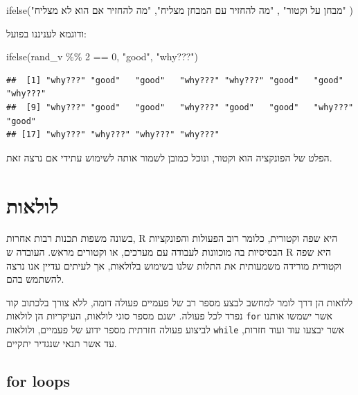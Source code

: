 \documentclass[
]{book}
\newenvironment{Shaded}{\begin{snugshade}}{\end{snugshade}}
\newcommand{\DecValTok}[1]{\textcolor[rgb]{0.00,0.00,0.81}{#1}}
\newcommand{\FunctionTok}[1]{\textcolor[rgb]{0.00,0.00,0.00}{#1}}
\newcommand{\NormalTok}[1]{#1}
\newcommand{\SpecialCharTok}[1]{\textcolor[rgb]{0.00,0.00,0.00}{#1}}
\newcommand{\StringTok}[1]{\textcolor[rgb]{0.31,0.60,0.02}{#1}}
\begin{document}
\begin{Shaded}
\begin{Highlighting}[]
\FunctionTok{ifelse}\NormalTok{(}\StringTok{"מבחן על וקטור"}\NormalTok{ ,}
       \StringTok{"מה להחזיר עם המבחן מצליח"}\NormalTok{,}
       \StringTok{"מה להחזיר אם הוא לא מצליח"}
\NormalTok{       )}
\end{Highlighting}
\end{Shaded}

ודוגמא לעניננו בפועל:

\begin{Shaded}
\begin{Highlighting}[]
\FunctionTok{ifelse}\NormalTok{(rand\_v }\SpecialCharTok{\%\%} \DecValTok{2} \SpecialCharTok{==} \DecValTok{0}\NormalTok{,}
       \StringTok{"good"}\NormalTok{,}
       \StringTok{"why???"}\NormalTok{)}
\end{Highlighting}
\end{Shaded}

\begin{verbatim}
##  [1] "why???" "good"   "good"   "why???" "why???" "good"   "good"   "why???"
##  [9] "why???" "good"   "good"   "why???" "good"   "good"   "why???" "good"  
## [17] "why???" "why???" "why???" "why???"
\end{verbatim}

הפלט של הפונקציה הוא וקטור, ונוכל כמובן לשמור אותה לשימוש עתידי אם נרצה זאת.

\hypertarget{ux5dcux5d5ux5dcux5d0ux5d5ux5ea}{%
\chapter{לולאות}\label{ux5dcux5d5ux5dcux5d0ux5d5ux5ea}}

בשונה משפות תכנות רבות אחרות,
R
היא שפה וקטורית,
כלומר רוב הפעולות והפונקציות הבסיסיות בה מוכוונות לעבודה עם מערכים, או וקטורים מראש. העובדה ש
R
היא שפה וקטורית מורידה משמעותית את התלות שלנו בשימוש בלולאות, אך לעיתים עדיין אנו נרצה להשתמש בהם.

ללואות הן דרך לומר למחשב לבצע מספר רב של פעמיים פעולה דומה, ללא צורך בלכתוב קוד נפרד לכל פעולה. ישנם מספר סוגי לולאות, העיקריות הן לולאות
\texttt{for}
אשר ישמשו אותנו לביצוע פעולה חזרתית מספר ידוע של פעמיים,
ולולאות
\texttt{while}
אשר יבצעו עוד ועוד חזרות, עד אשר תנאי שנגדיר יתקיים.

\hypertarget{for-loops}{%
\section{for loops}\label{for-loops}}
\end{document}
